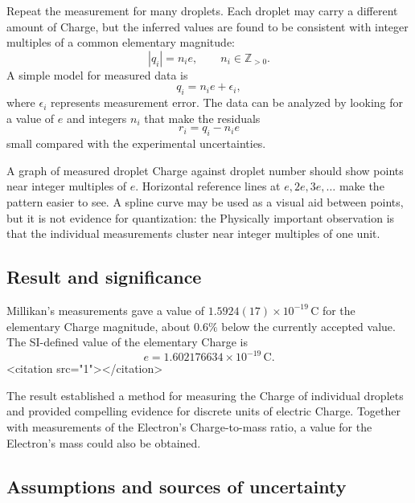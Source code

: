 \documentclass[a4paper, 10pt, onepage]{elegantbook}
\begin{document}
{Repeat the measurement for many droplets. Each droplet may carry a
different amount of Charge, but the inferred values are found to be
consistent with integer multiples of a common elementary magnitude:
\begin{equation}
|q_i|=n_i e,
\qquad n_i\in\mathbb{Z}_{>0}.
\end{equation}
A simple model for measured data is
\begin{equation}
q_i=n_i e+\epsilon_i,
\label{eq:data-model}
\end{equation}
where \(\epsilon_i\) represents measurement error. The data can be
analyzed by looking for a value of \(e\) and integers \(n_i\) that
make the residuals
\begin{equation}
r_i=q_i-n_i e
\end{equation}
small compared with the experimental uncertainties.

A graph of measured droplet Charge against droplet number should show
points near integer multiples of \(e\). Horizontal reference lines at
\(e,2e,3e,\ldots\) make the pattern easier to see. A spline curve may
be used as a visual aid between points, but it is not evidence for
quantization: the Physically important observation is that the
individual measurements cluster near integer multiples of one unit.

\subsection{Result and significance}

Millikan's measurements gave a value of
\(1.5924(17)\times10^{-19}\,\mathrm{C}\) for the elementary Charge
magnitude, about \(0.6\%\) below the currently accepted value. The
SI-defined value of the elementary Charge is
\begin{equation}
e=1.602176634\times10^{-19}\,\mathrm{C}.
\label{eq:modern-e}
\end{equation}
<citation src="1"></citation>

The result established a method for measuring the Charge of
individual droplets and provided compelling evidence for discrete
units of electric Charge. Together with measurements of the
Electron's Charge-to-mass ratio, a value for the Electron's mass
could also be obtained.

\subsection{Assumptions and sources of uncertainty}

}
\end{document}
